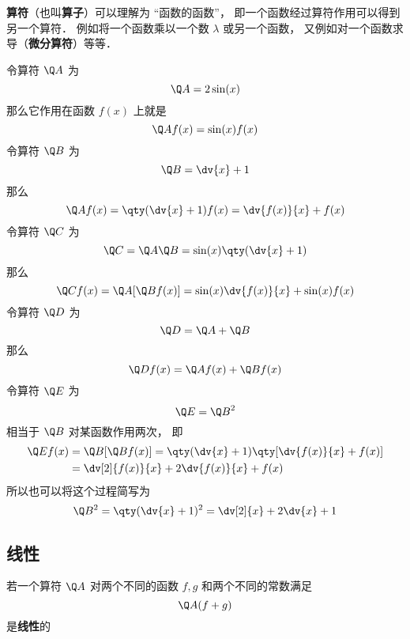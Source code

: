 

\textbf{算符}（也叫\textbf{算子}）可以理解为 “函数的函数”， 即一个函数经过算符作用可以得到另一个算符． 例如将一个函数乘以一个数 $\lambda$ 或另一个函数， 又例如对一个函数求导（\textbf{微分算符}）等等．

\begin{example}{}
令算符 $\Q A$ 为
\begin{equation}
\Q A = 2\sin(x)
\end{equation}
那么它作用在函数 $f(x)$ 上就是
\begin{equation}
\Q A f(x) = \sin(x) f(x)
\end{equation}
令算符 $\Q B$ 为
\begin{equation}
\Q B = \dv{x} + 1
\end{equation}
那么
\begin{equation}
\Q A f(x) = \qty(\dv{x} + 1)f(x) = \dv{f(x)}{x} + f(x)
\end{equation}
令算符 $\Q C$ 为
\begin{equation}
\Q C = \Q A \Q B = \sin(x) \qty(\dv{x} + 1)
\end{equation}
那么
\begin{equation}
\Q C f(x) = \Q A [\Q B f(x)] = \sin(x)\dv{f(x)}{x} + \sin(x)f(x)
\end{equation}
令算符 $\Q D$ 为
\begin{equation}
\Q D = \Q A + \Q B
\end{equation}
那么
\begin{equation}
\Q D f(x) = \Q A f(x) + \Q B f(x)
\end{equation}
令算符 $\Q E$ 为
\begin{equation}
\Q E = {\Q B}^2
\end{equation}
相当于 $\Q B$ 对某函数作用两次， 即
\begin{equation}
\begin{aligned}
\Q E f(x) &= \Q B [\Q B f(x)] = \qty(\dv{x} + 1)\qty[\dv{f(x)}{x} + f(x)] \\
&= \dv[2]{f(x)}{x} + 2\dv{f(x)}{x} + f(x)
\end{aligned}
\end{equation}
所以也可以将这个过程简写为
\begin{equation}
\Q B^2 = \qty(\dv{x} + 1)^2 = \dv[2]{x} + 2\dv{x} + 1
\end{equation}
\end{example}

\subsection{线性}
若一个算符 $\Q A$ 对两个不同的函数 $f, g$ 和两个不同的常数满足
\begin{equation}
\Q A (f + g)
\end{equation}
是\textbf{线性}的
